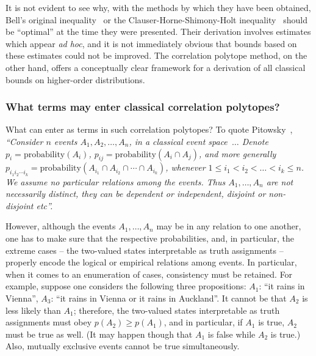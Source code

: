 It is not evident to see why, with the methods by which they have been obtained, Bell's original inequality~\cite{bell-66,Bell-71}
or the Clauser-Horne-Shimony-Holt inequality~\cite{chsh} should be ``optimal'' at the time they were presented.
Their derivation involves estimates which appear {\em ad hoc}, and it is not immediately obvious that bounds based on these estimates
could not be improved.
The correlation polytope method, on the other hand, offers a conceptually clear framework for a derivation of all classical bounds on
higher-order distributions.

\subsubsection{What terms may enter classical correlation polytopes?}
\label{2017-b-wtmeccp}


What can enter as terms in such correlation polytopes?
To quote Pitowsky~\cite[p.~38]{pitowsky-89a},
{\em ``Consider $n$ events $A_1 , A_2, \ldots ,A_n$, in a classical event
space~$\ldots$
Denote
$p_i = \text{probability} (A_i)$,
$p_{ij} = \text{probability} (A_i \cap A_j)$,
and more generally
$p_{{i_1}{i_2}\cdots {i_k}} = \text{probability} \left (   A_{i_1} \cap A_{i_2} \cap \cdots  \cap  A_{i_k} \right)$,
whenever $1 \le i_1 < i_2 < \ldots < i_k \le n$.
We assume no particular relations among the events. Thus $A_1 ,  \ldots ,A_n$ are not
necessarily distinct, they can be dependent or independent, disjoint or non-disjoint
etc''.}

However, although the events $A_1 , \ldots ,A_n$ may be in any  relation to one another, one has to make sure that
the respective probabilities, and, in particular, the extreme cases -- the two-valued states interpretable as truth assignments
 --
properly encode the logical or empirical relations among events. In particular, when it comes to an enumeration of cases, consistency must be retained.
For example, suppose one considers the following three
propositions:
$A_1$: ``it rains in Vienna'',
$A_3$: ``it rains in Vienna or it rains in Auckland''.
It cannot be that $A_2$ is less likely than $A_1$;
therefore, the two-valued states interpretable as truth assignments must obey
$p(A_2) \ge p(A_1)$, and in particular, if $A_1$ is true, $A_2$ must be true as well.
(It may happen though that $A_1$ is false while $A_2$ is true.)
Also, mutually exclusive events cannot be true simultaneously.



